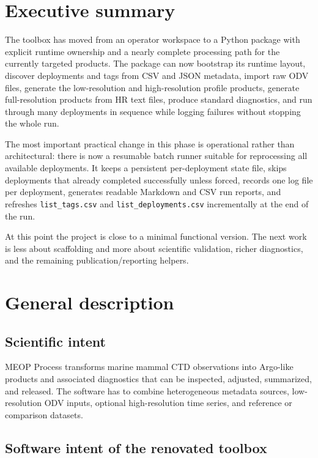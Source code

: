 \documentclass[11pt,a4paper]{article}
\newcommand{\pkg}[1]{\texttt{#1}}
\begin{document}
\tableofcontents
\newpage

\section{Executive summary}

The toolbox has moved from an operator workspace to a Python package with explicit runtime ownership and a nearly complete processing path for the currently targeted products. The package can now bootstrap its runtime layout, discover deployments and tags from CSV and JSON metadata, import raw ODV files, generate the low-resolution and high-resolution profile products, generate full-resolution products from HR text files, produce standard diagnostics, and run through many deployments in sequence while logging failures without stopping the whole run.

The most important practical change in this phase is operational rather than architectural: there is now a resumable batch runner suitable for reprocessing all available deployments. It keeps a persistent per-deployment state file, skips deployments that already completed successfully unless forced, records one log file per deployment, generates readable Markdown and CSV run reports, and refreshes \pkg{list\_tags.csv} and \pkg{list\_deployments.csv} incrementally at the end of the run.

At this point the project is close to a minimal functional version. The next work is less about scaffolding and more about scientific validation, richer diagnostics, and the remaining publication/reporting helpers.

\section{General description}

\subsection{Scientific intent}

MEOP Process transforms marine mammal CTD observations into Argo-like products and associated diagnostics that can be inspected, adjusted, summarized, and released. The software has to combine heterogeneous metadata sources, low-resolution ODV inputs, optional high-resolution time series, and reference or comparison datasets.

\subsection{Software intent of the renovated toolbox}
\end{document}
